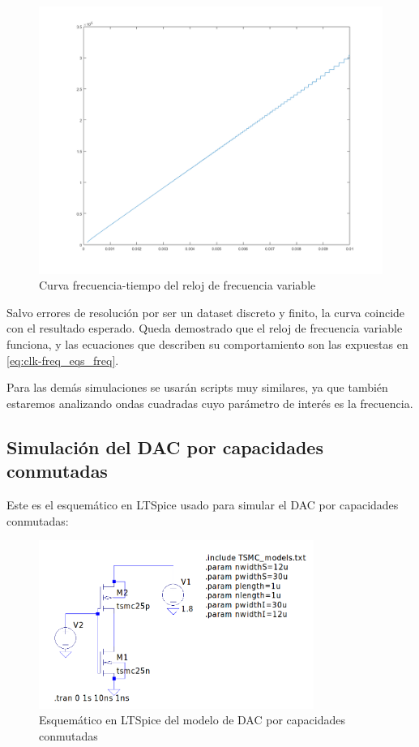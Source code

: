 \documentclass[12pt]{report} %
\begin{document}
	\begin{figure}[H]
		\centerline{\includegraphics[width=1.1\textwidth]{ml-clk-freq-curve.png}}
		\caption[Curva frecuencia-tiempo del reloj de frecuencia variable]{Curva frecuencia-tiempo del reloj de frecuencia variable}
		\label{fig:ml-clk-freq-curve.png}
	\end{figure}

	Salvo errores de resolución por ser un dataset discreto y finito, la curva coincide con el resultado esperado. Queda demostrado que el reloj de frecuencia variable funciona, y las ecuaciones que describen su comportamiento son las expuestas en \ref{eq:clk-freq_eqs_freq}.
	
	Para las demás simulaciones se usarán scripts muy similares, ya que también estaremos analizando ondas cuadradas cuyo parámetro de interés es la frecuencia.	




	\subsection{Simulación del DAC por capacidades conmutadas}
	
	Este es el esquemático en LTSpice usado para simular el DAC por capacidades conmutadas:
	
	\begin{figure}[H]
		\includegraphics[width=0.8\textwidth]{ltspice-sw-cap-empty.png}
		\caption[Esquemático en LTSpice del modelo de DAC por capacidades conmutadas]{Esquemático en LTSpice del modelo de DAC por capacidades conmutadas}
		\label{fig:ltspice-sw-cap-empty.png}
	\end{figure}
	
\end{document}
